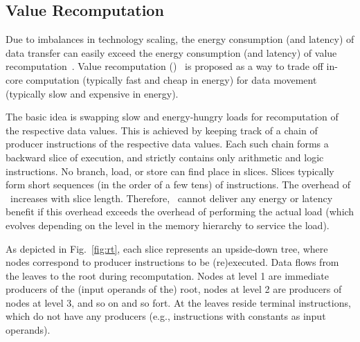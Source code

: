 \subsection{Value Recomputation}
\label{sec:recmp}

Due to imbalances in technology scaling,  the energy consumption (and latency) of
data transfer can easily exceed the energy consumption
(and latency) of value recomputation~\cite{ Horow}.
Value recomputation (\recomp)~\cite{amnesiac17,taxonomy18}  is proposed as a way to trade off in-core computation (typically fast and cheap in energy) for data movement (typically slow and expensive in energy).

The basic idea is swapping 
slow and energy-hungry loads for recomputation of the respective data values.  
This is achieved by keeping track of a chain of producer instructions of the respective data values. 
Each such chain forms a backward slice of execution, and strictly contains only arithmetic and logic instructions. 
No branch, load, or store can find place in slices. 
Slices typically form short sequences (in the order of a few tens) of
instructions. 
The overhead of \recomp\ increases with slice length. 
Therefore, \recomp\ cannot deliver any energy or latency benefit if this overhead exceeds the
overhead of performing the actual load (which evolves depending on the level in the memory hierarchy to service the load).

As depicted in Fig.~\ref{fig:rt}, each slice represents an upside-down tree, where nodes correspond to producer instructions to be (re)executed. Data flows from the leaves to the root during recomputation. Nodes at level 1 are immediate producers of
the (input operands of the) root, nodes at level 2 are 
producers of nodes at level 3, and so on and so fort. At the leaves reside terminal instructions, which do
not have any producers (e.g., instructions with constants as input operands).



